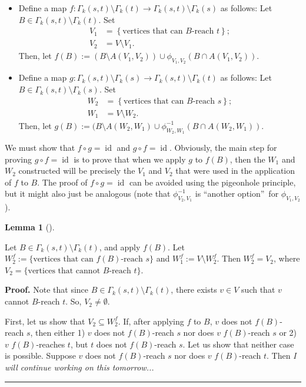 \documentclass[numbers=enddot,12pt,final,onecolumn,notitlepage]{scrartcl}%
\theoremstyle{definition}
\newtheorem{lem}[theo]{Lemma}
\newenvironment{lemma}[1][]
{\begin{lem}[#1]\begin{leftbar}}
{\end{leftbar}\end{lem}}
\newenvironment{proof}[1][Proof]{\noindent\textbf{#1.} }{\ \rule{0.5em}{0.5em}}
\theoremstyle{plainsl}
\begin{document}
\begin{itemize}
\item Define a map $f:\Gamma_{k}\left(  s,t\right)  \setminus\Gamma_{k}\left(
t\right)  \rightarrow\Gamma_{k}\left(  s,t\right)  \setminus\Gamma_{k}\left(
s\right)  $ as follows: Let $B\in\Gamma_{k}\left(  s,t\right)  \setminus
\Gamma_{k}\left(  t\right)  $. Set%
\begin{align*}
V_{1}  &  =\left\{  \text{vertices that can }B\text{-reach }t\right\}  ;\\
V_{2}  &  =V\setminus V_{1}.
\end{align*}
Then, let $f\left(  B\right)  :=(B \setminus A(V_1,V_2)) \cup \phi_{V_1,V_2}(B \cap A(V_1,V_2))$. 

\item Define a map $g:\Gamma_{k}\left(  s,t\right)  \setminus\Gamma_{k}\left(
s\right)  \rightarrow\Gamma_{k}\left(  s,t\right)  \setminus\Gamma_{k}\left(
t\right)  $ as follows: Let $B\in\Gamma_{k}\left(  s,t\right)  \setminus
\Gamma_{k}\left(  s\right)  $. Set%
\begin{align*}
W_{2}  &  =\left\{  \text{vertices that can }B\text{-reach }s\right\}  ;\\
W_{1}  &  =V\setminus W_{2}.
\end{align*}
Then, let $g\left(  B\right)  := (B \setminus A(W_{2},W_{1}) \cup \phi_{W_{2},W_{1}}^{-1}\left( B \cap A(W_{2},W_{1})\right)  $.
\end{itemize}

We must show that $f\circ g=\operatorname*{id}$ and $g\circ
f=\operatorname*{id}$. Obviously, the main step for proving $g\circ
f=\operatorname*{id}$ is to prove that when we apply $g$ to $f\left(
B\right)  $, then the $W_{1}$ and $W_{2}$ constructed will be precisely the
$V_{1}$ and $V_{2}$ that were used in the application of $f$ to $B$. The proof
of $f\circ g=\operatorname*{id}$ can be avoided using the pigeonhole
principle, but it might also just be analogous (note that $\phi_{V_{2},V_{1}%
}^{-1}$ is \textquotedblleft another option\textquotedblright\ for
$\phi_{V_{1},V_{2}}$).

\begin{lemma}
    Let $B \in \Gamma_{k}(s,t) \setminus \Gamma_{k}(t)$, and apply $f(B)$. Let $W_{2}^{f} := \{\text{vertices that can $f(B)$-reach $s$}\}$ and $W_{1}^f := V \setminus W_{2}^f$. Then $W_{2}^f = V_{2}$, where $V_{2} = \{\text{vertices that cannot $B$-reach $t$}\}$.
\end{lemma}

\begin{proof}
    Note that since $B \in \Gamma_{k}(s,t) \setminus \Gamma_{k}(t)$, there exists $v \in V$ such that $v$ cannot $B$-reach $t$. So, $V_{2} \neq \emptyset$.

    First, let us show that $V_{2} \subseteq W_{2}^f$. If, after applying $f$ to $B$, $v$ does not $f(B)$-reach $s$, then either 1) $v$ does not $f(B)$-reach $s$ nor does $v$ $f(B)$-reach $s$ or 2) $v$ $f(B)$-reaches $t$, but $t$ does not $f(B)$-reach $s$. Let us show that neither case is possible. Suppose $v$ does not $f(B)$-reach $s$ nor does $v$ $f(B)$-reach $t$. Then \textit{I will continue working on this tomorrow...}
\end{proof}
\end{document}
